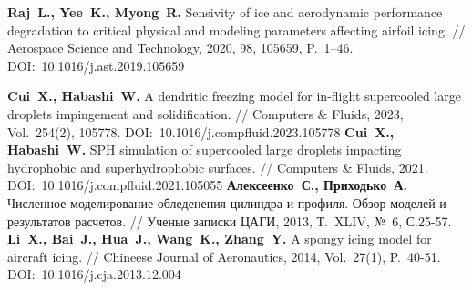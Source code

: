 \begin{thebibliography}{99}
\textbf{Raj~L., Yee~K., Myong~R.} Sensivity of ice and aerodynamic performance degradation to critical physical and modeling parameters affecting airfoil icing. // Aerospace Science and Technology, 2020, 98, 105659, P.~1–46. DOI:~10.1016/j.ast.2019.105659

\textbf{Cui~X., Habashi~W.} A dendritic freezing model for in-flight supercooled large droplets impingement and solidification. // Computers \& Fluids, 2023, Vol.~254(2), 105778. DOI:~10.1016/j.compfluid.2023.105778
\textbf{Cui~X., Habashi~W.} SPH simulation of supercooled large droplets impacting hydrophobic and superhydrophobic surfaces. // Computers \& Fluids, 2021. DOI:~10.1016/j.compfluid.2021.105055
\textbf{Алексеенко~С., Приходько~А.} Численное моделирование обледенения цилиндра и профиля. Обзор моделей и результатов расчетов. // Ученые записки ЦАГИ, 2013, Т.~XLIV, №~6, С.25-57.
\textbf{Li~X., Bai~J., Hua~J., Wang~K., Zhang~Y.} A spongy icing model for aircraft icing. // Chineese Journal of Aeronautics, 2014, Vol.~27(1), P.~40-51. DOI:~10.1016/j.cja.2013.12.004


\end{thebibliography}
